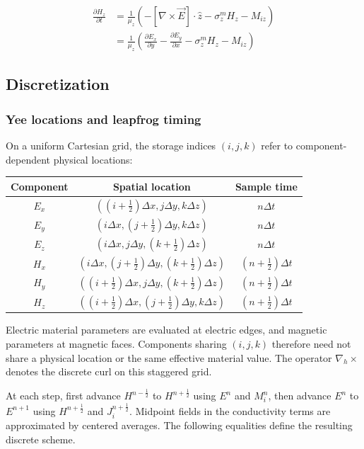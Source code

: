 \documentclass[10pt]{article}
\begin{document}
\begin{equation}
    \begin{aligned}
        \frac{\partial H_{z}}{\partial t} &= \frac{1}{\mu_{z}} \left( - \left[ \nabla \times \vec{E} \right] \cdot \hat{z} - \sigma^{m}_{z} H_{z} - M_{iz} \right) \\
        & = \frac{1}{\mu_{z}} \left( \frac{\partial E_{x}}{\partial y} - \frac{\partial E_{y}}{\partial x} - \sigma^{m}_{z} H_{z} - M_{iz} \right)
    \end{aligned}
\end{equation}



\subsection{Discretization}%
\subsubsection{Yee locations and leapfrog timing}
On a uniform Cartesian grid, the storage indices $(i,j,k)$ refer to
component-dependent physical locations:
\begin{center}
\renewcommand{\arraystretch}{1.2}
\begin{tabular}{ccc}
\toprule
Component & Spatial location & Sample time \\
\midrule
$E_x$ & $((i+\frac12)\Delta x,j\Delta y,k\Delta z)$ & $n\Delta t$ \\
$E_y$ & $(i\Delta x,(j+\frac12)\Delta y,k\Delta z)$ & $n\Delta t$ \\
$E_z$ & $(i\Delta x,j\Delta y,(k+\frac12)\Delta z)$ & $n\Delta t$ \\
$H_x$ & $(i\Delta x,(j+\frac12)\Delta y,(k+\frac12)\Delta z)$ & $(n+\frac12)\Delta t$ \\
$H_y$ & $((i+\frac12)\Delta x,j\Delta y,(k+\frac12)\Delta z)$ & $(n+\frac12)\Delta t$ \\
$H_z$ & $((i+\frac12)\Delta x,(j+\frac12)\Delta y,k\Delta z)$ & $(n+\frac12)\Delta t$ \\
\bottomrule
\end{tabular}
\end{center}
Electric material parameters are evaluated at electric edges, and magnetic
parameters at magnetic faces. Components sharing $(i,j,k)$ therefore need
not share a physical location or the same effective material value.
The operator $\nabla_h\times$ denotes the discrete curl on this staggered grid.

At each step, first advance $H^{n-\frac12}$ to $H^{n+\frac12}$ using $E^n$
and $M_i^n$, then advance $E^n$ to $E^{n+1}$ using $H^{n+\frac12}$ and
$J_i^{n+\frac12}$. Midpoint fields in the conductivity terms are approximated
by centered averages. The following equalities define the resulting
discrete scheme.
\end{document}
